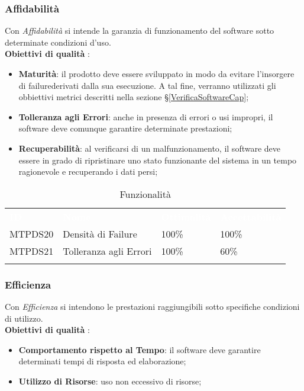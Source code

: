 \subsubsection{Affidabilità}

Con \textit{Affidabilità} si intende la garanzia di funzionamento del software sotto determinate condizioni d'uso. \\
\textbf{Obiettivi di qualità} :

\begin{itemize}
	\item \textbf{Maturità}: il prodotto deve essere sviluppato in modo da evitare l'insorgere di failure\glossario derivati dalla sua esecuzione. A tal fine, verranno utilizzati gli obbiettivi metrici descritti nella sezione §\ref{VerificaSoftwareCap};
	\item \textbf{Tolleranza agli Errori}: anche in presenza di errori o usi impropri, il software deve comunque garantire determinate prestazioni;
	\item \textbf{Recuperabilità}: al verificarsi di un malfunzionamento, il software deve essere in grado di ripristinare uno stato funzionante del sistema in un tempo ragionevole e recuperando i dati persi;
\end{itemize}

\begin{longtable}{|C{.15\textwidth}|C{.24\textwidth}|C{.24\textwidth}|C{.24\textwidth}|}
\hline
{}\textbf{\textcolor{white}{ID}} & \textbf{\textcolor{white}{Nome}} & \textbf{\textcolor{white}{Ottimalità}} & \textbf{\textcolor{white}{Accettabilità}}\\
MTPDS20 & Densità di Failure & 100\% & 100\%\\
\hline
{}MTPDS21 & Tolleranza agli Errori & 100\% & 60\% \\ 
\hline
\caption{Funzionalità}
\label{Funzionalità}
\end{longtable}



\subsubsection{Efficienza}

Con \textit{Efficienza} si intendono le prestazioni raggiungibili sotto specifiche condizioni di utilizzo. \\
\textbf{Obiettivi di qualità} :

\begin{itemize}
	\item \textbf{Comportamento rispetto al Tempo}: il software deve garantire determinati tempi di risposta ed elaborazione;
	\item \textbf{Utilizzo di Risorse}: uso non eccessivo di risorse;
\end{itemize}

